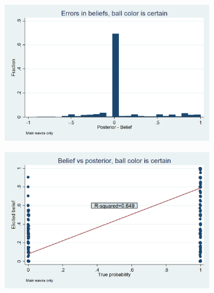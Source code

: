 \documentclass[12pt,a4paper]{article}
\begin{document}
\begin{figure}[H]
\begin{subfigure}[t]{.48\textwidth}
\end{subfigure}
\begin{subfigure}[t]{.48\textwidth}
  \centering
  \includegraphics[width=\textwidth]{Graphs/hist_belief_error_s5.png}
\end{subfigure}
\begin{subfigure}[t]{.48\textwidth}
  \centering
  \includegraphics[width=\textwidth]{Graphs/updating_s5.png}

\end{subfigure}

\end{figure}
\end{document}
